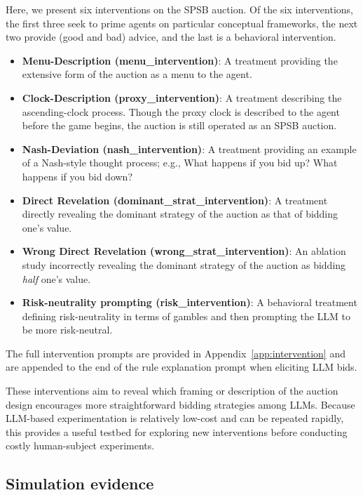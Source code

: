\documentclass{article} %
\newcommand{\kibitz}[2]{\ifnum\Comments=1{\color{#1}{#2}}\fi}
\newcommand{\dcp}[1]{\kibitz{teal}{[DCP: #1]}}
\begin{document}
Here, we present six interventions on the SPSB auction. Of the six  interventions, the first three seek to prime agents on particular conceptual frameworks,
the next two provide (good and bad) advice, and the last is a behavioral intervention.
%
\begin{itemize}
    \item \textbf{Menu-Description (menu\_intervention)}: A treatment providing the extensive form of the auction as a menu to the agent. 
    \item \textbf{Clock-Description (proxy\_intervention)}: A treatment describing the ascending-clock process. Though the proxy clock is described to the agent before the game begins, the auction is still operated as an SPSB auction.
    \item \textbf{Nash-Deviation (nash\_intervention)}: A treatment providing an example of a Nash-style thought process; e.g., What happens if you bid up? What happens if you bid down?
    \item \textbf{Direct Revelation (dominant\_strat\_intervention)}: A treatment directly revealing the dominant strategy of the auction as that of bidding one's value.
    \item \textbf{Wrong Direct Revelation (wrong\_strat\_intervention)}: An ablation study incorrectly revealing the dominant strategy of the auction as bidding \textit{half} one's value.
    \item \textbf{Risk-neutrality prompting (risk\_intervention)}: A behavioral treatment defining risk-neutrality in terms of gambles and then prompting the LLM to be more risk-neutral.
\end{itemize}

\noindent
The full intervention prompts are provided in Appendix~\ref{app:intervention} and are appended to the end of the rule explanation prompt when eliciting LLM bids.


These interventions aim to reveal which framing or description of the auction design encourages more straightforward bidding strategies among LLMs. 
Because LLM-based experimentation is relatively low-cost and can be repeated rapidly, this provides a useful testbed for exploring new interventions before conducting costly human-subject experiments. 

\subsection{Simulation evidence}
\end{document}
